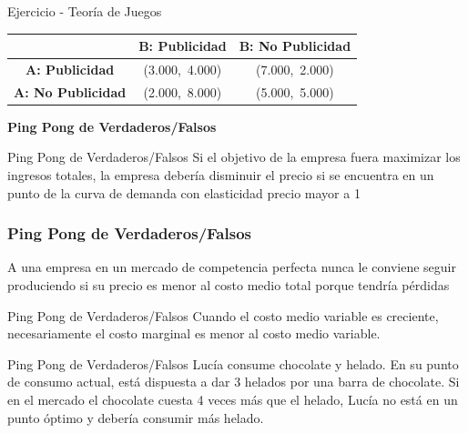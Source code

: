 \documentclass{beamer}
\begin{document}
\begin{frame}{Ejercicio - Teoría de Juegos}
\begin{center}
\renewcommand{\arraystretch}{1.8} %
\begin{tabular}{c|c|c}
 & \textbf{B: Publicidad} & \textbf{B: No Publicidad} \\
\hline
\textbf{A: Publicidad} & (3.000,\ 4.000) & (7.000,\ 2.000) \\
\textbf{A: No Publicidad} & (2.000,\ 8.000) & (5.000,\ 5.000) \\
\end{tabular}
\end{center}
\end{frame}

\begin{frame}
    \centering
    \begin{boxB}
    \centering \Large \textbf{Ping Pong de Verdaderos/Falsos} \\   
    \end{boxB}
\end{frame}

\begin{frame}{Ping Pong de Verdaderos/Falsos}
    \centering
    Si el objetivo de la empresa fuera maximizar los ingresos totales, la empresa debería disminuir el precio si se encuentra en un punto de la curva de demanda con elasticidad precio mayor a 1
\end{frame}

\begin{frame}
\frametitle{Ping Pong de Verdaderos/Falsos}
\centering
A una empresa en un mercado de competencia perfecta nunca le conviene seguir produciendo si su precio es menor al costo medio total porque tendría pérdidas
\end{frame}

\begin{frame}{Ping Pong de Verdaderos/Falsos}
    \centering
    Cuando el costo medio variable es creciente, necesariamente el costo marginal es menor al costo medio variable.
\end{frame}

\begin{frame}{Ping Pong de Verdaderos/Falsos}
    \centering
    Lucía consume chocolate y helado. En su punto de consumo actual, está dispuesta a dar 3 helados por una barra de chocolate. Si en el mercado el chocolate cuesta 4 veces más que el helado, Lucía no está en un punto óptimo y debería consumir más helado.
\end{frame}
\end{document}
